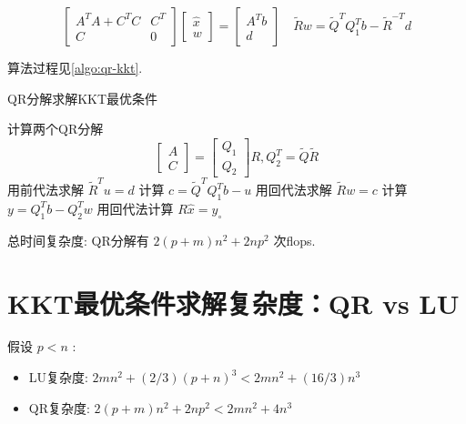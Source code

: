 \begin{equation} \left[\begin{array}{cc}A^{T} A+C^{T} C & C^{T} \\ C & 0\end{array}\right]\left[\begin{array}{c}\hat{x} \\ w\end{array}\right]=\left[\begin{array}{c}A^{T} b \\ d\end{array}\right] \quad \tilde{R} w=\tilde{Q}^{T} Q_{1}^{T} b-\tilde{R}^{-T} d \end{equation}

算法过程见\ref{algo:qr-kkt}.

\begin{algorithm}[htbp]
    \caption{QR分解求解KKT最优条件}

    \label{algo:qr-kkt}
    计算两个QR分解
\begin{equation}
\left[\begin{array}{l}
A\\
C
\end{array}\right]=\left[\begin{array}{l}
Q_{1} \\
Q_{2}
\end{array}\right] R, Q_{2}^{T}=\tilde{Q} \tilde{R}
\end{equation}\;
用前代法求解 $ \tilde{R}^{T} u=d $ \;
计算 $ c=\tilde{Q}^{T} Q_{1}^{T} b-u $\;
用回代法求解 $ \tilde{R} w=c $ \;
计算 $ y=Q_{1}^{T} b-Q_{2}^{T} w $\;
用回代法计算 $ R \hat{x}=y_{\circ} $\;

\end{algorithm}

总时间复杂度: QR分解有 $ 2(p+m) n^{2}+2 n p^{2} $ 次flops.


\section{KKT最优条件求解复杂度：QR vs LU}

假设 $ p<n $ :

\begin{itemize}
    \item LU复杂度: $ 2 m n^{2}+(2 / 3)(p+n)^{3}<2 m n^{2}+(16 / 3) n^{3} $
    \item QR复杂度: $ 2(p+m) n^{2}+2 n p^{2}<2 m n^{2}+4 n^{3} $
\end{itemize}

